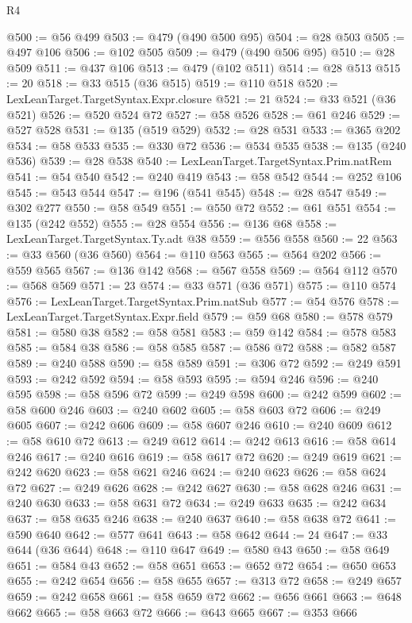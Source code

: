 \begin{lexlean}{R4}
\begin{coremodule}
@500 := @56 @499
@503 := @479 (@490 @500 @95)
@504 := @28 @503
@505 := @497 @106
@506 := @102 @505
@509 := @479 (@490 @506 @95)
@510 := @28 @509
@511 := @437 @106
@513 := @479 (@102 @511)
@514 := @28 @513
@515 := 20
@518 := @33 @515 (@36 @515)
@519 := @110 @518
@520 := LexLeanTarget.TargetSyntax.Expr.closure
@521 := 21
@524 := @33 @521 (@36 @521)
@526 := @520 @524 @72
@527 := @58 @526
@528 := @61 @246
@529 := @527 @528
@531 := @135 (@519 @529)
@532 := @28 @531
@533 := @365 @202
@534 := @58 @533
@535 := @330 @72
@536 := @534 @535
@538 := @135 (@240 @536)
@539 := @28 @538
@540 := LexLeanTarget.TargetSyntax.Prim.natRem
@541 := @54 @540
@542 := @240 @419
@543 := @58 @542
@544 := @252 @106
@545 := @543 @544
@547 := @196 (@541 @545)
@548 := @28 @547
@549 := @302 @277
@550 := @58 @549
@551 := @550 @72
@552 := @61 @551
@554 := @135 (@242 @552)
@555 := @28 @554
@556 := @136 @68
@558 := LexLeanTarget.TargetSyntax.Ty.adt @38
@559 := @556 @558
@560 := 22
@563 := @33 @560 (@36 @560)
@564 := @110 @563
@565 := @564 @202
@566 := @559 @565
@567 := @136 @142
@568 := @567 @558
@569 := @564 @112
@570 := @568 @569
@571 := 23
@574 := @33 @571 (@36 @571)
@575 := @110 @574
@576 := LexLeanTarget.TargetSyntax.Prim.natSub
@577 := @54 @576
@578 := LexLeanTarget.TargetSyntax.Expr.field
@579 := @59 @68
@580 := @578 @579
@581 := @580 @38
@582 := @58 @581
@583 := @59 @142
@584 := @578 @583
@585 := @584 @38
@586 := @58 @585
@587 := @586 @72
@588 := @582 @587
@589 := @240 @588
@590 := @58 @589
@591 := @306 @72
@592 := @249 @591
@593 := @242 @592
@594 := @58 @593
@595 := @594 @246
@596 := @240 @595
@598 := @58 @596 @72
@599 := @249 @598
@600 := @242 @599
@602 := @58 @600 @246
@603 := @240 @602
@605 := @58 @603 @72
@606 := @249 @605
@607 := @242 @606
@609 := @58 @607 @246
@610 := @240 @609
@612 := @58 @610 @72
@613 := @249 @612
@614 := @242 @613
@616 := @58 @614 @246
@617 := @240 @616
@619 := @58 @617 @72
@620 := @249 @619
@621 := @242 @620
@623 := @58 @621 @246
@624 := @240 @623
@626 := @58 @624 @72
@627 := @249 @626
@628 := @242 @627
@630 := @58 @628 @246
@631 := @240 @630
@633 := @58 @631 @72
@634 := @249 @633
@635 := @242 @634
@637 := @58 @635 @246
@638 := @240 @637
@640 := @58 @638 @72
@641 := @590 @640
@642 := @577 @641
@643 := @58 @642
@644 := 24
@647 := @33 @644 (@36 @644)
@648 := @110 @647
@649 := @580 @43
@650 := @58 @649
@651 := @584 @43
@652 := @58 @651
@653 := @652 @72
@654 := @650 @653
@655 := @242 @654
@656 := @58 @655
@657 := @313 @72
@658 := @249 @657
@659 := @242 @658
@661 := @58 @659 @72
@662 := @656 @661
@663 := @648 @662
@665 := @58 @663 @72
@666 := @643 @665
@667 := @353 @666

\end{coremodule}
\end{lexlean}

